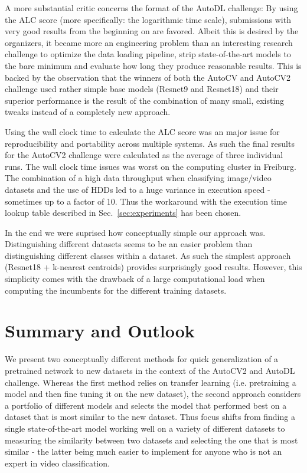\documentclass{article}
\begin{document}
A more substantial critic concerns the format of the AutoDL challenge: By using the ALC score (more specifically: the logarithmic time scale), submissions with very good results from the beginning on are favored. Albeit this is desired by the organizers, it became more an engineering problem than an interesting research challenge to optimize the data loading pipeline, strip state-of-the-art models to the bare minimum and evaluate how long they produce reasonable results. This is backed by the observation that the winners of both the AutoCV and AutoCV2 challenge used rather simple base models (Resnet9 and Resnet18) and their superior performance is the result of the combination of many small, existing tweaks instead of a completely new approach.

Using the wall clock time to calculate the ALC score was an major issue for reproducibility and portability across multiple systems. As such the final results for the AutoCV2 challenge were calculated as the average of three individual runs. The wall clock time issues was worst on the computing cluster in Freiburg. The combination of a high data throughput when classifying image/video datasets and the use of HDDs led to a huge variance in execution speed - sometimes up to a factor of 10. Thus the workaround with the execution time lookup table described in Sec.~\ref{sec:experiments} has been chosen.

In the end we were suprised how conceptually simple our approach was. Distinguishing different datasets seems to be an easier problem than distinguishing different classes within a dataset. As such the simplest approach (Resnet18 +  k-nearest centroids) provides surprisingly good results. However, this simplicity comes with the drawback of a large computational load when computing the incumbents for the different training datasets.

\section{Summary and Outlook}
\label{sec:summary}

We present two conceptually different methods for quick generalization of a pretrained network to new datasets in the context of the AutoCV2 and AutoDL challenge. Whereas the first method relies on transfer learning (i.e. pretraining a model and then fine tuning it on the new dataset), the second approach considers a portfolio of different models and selects the model that performed best on a dataset that is most similar to the new dataset.
Thus focus shifts from finding a single state-of-the-art model working well on a variety of different datasets to measuring the similarity between two datasets and selecting the one that is most similar - the latter being much easier to implement for anyone who is not an expert in video classification. 
\end{document}
